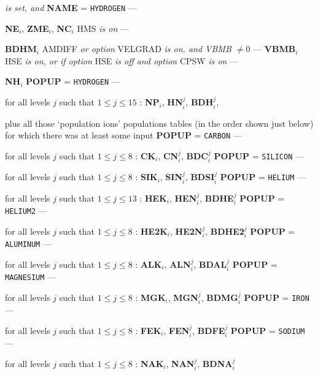 {\it is set, and } {\bf NAME} = {\tt HYDROGEN} --- \par \noindent
{\bf NE}$_i$, {\bf ZME}$_i$, {\bf NC}$_i$
\spice
{} HMS {\it is on} --- \par \noindent
{\bf BDHM}$_i$
\spice
{} AMDIFF {\it or option } VELGRAD
{\it is on, and {\rm VBMB} $\neq 0$} --- \np
{\bf VBMB}$_i$
\spice
{} HSE {\it is on, or if option }
HSE {\it is off and option } CPSW {\it is on} --- \par \noindent
{\bf NH}$_i$
\spice
{} {\bf POPUP} = {\tt HYDROGEN} --- \par \noindent
for all levels $j$ such that $1 \leq j \leq 15$ :
{\bf NP}$_i$, {\bf HN}$^j_i$, {\bf BDH}$^j_i$, \par \noindent
plus all those `population ions' populations tables (in the order shown
just below) for which there was at least some input
\spice
{} {\bf POPUP} = {\tt CARBON} --- \par \noindent
for all levels $j$ such that $1 \leq j \leq 8$ :
{\bf CK}$_i$, {\bf CN}$^j_i$, {\bf BDC}$^j_i$
\spice
{} {\bf POPUP} = {\tt SILICON} --- \par \noindent
for all levels $j$ such that $1 \leq j \leq 8$ :
{\bf SIK}$_i$, {\bf SIN}$^j_i$, {\bf BDSI}$^j_i$
\spice
{} {\bf POPUP} = {\tt HELIUM} --- \par \noindent
for all levels $j$ such that $1 \leq j \leq 13$ :
{\bf HEK}$_i$, {\bf HEN}$^j_i$, {\bf BDHE}$^j_i$
\spice
{} {\bf POPUP} = {\tt HELIUM2} --- \par \noindent
for all levels $j$ such that $1 \leq j \leq 8$ :
{\bf HE2K}$_i$, {\bf HE2N}$^j_i$, {\bf BDHE2}$^j_i$
\spice
{} {\bf POPUP} = {\tt ALUMINUM} --- \par \noindent
for all levels $j$ such that $1 \leq j \leq 8$ :
{\bf ALK}$_i$, {\bf ALN}$^j_i$, {\bf BDAL}$^j_i$
\spice
{} {\bf POPUP} = {\tt MAGNESIUM} --- \par \noindent
for all levels $j$ such that $1 \leq j \leq 8$ :
{\bf MGK}$_i$, {\bf MGN}$^j_i$, {\bf BDMG}$^j_i$
\spice
{} {\bf POPUP} = {\tt IRON} --- \par \noindent
for all levels $j$ such that $1 \leq j \leq 8$ :
{\bf FEK}$_i$, {\bf FEN}$^j_i$, {\bf BDFE}$^j_i$
\ej
{} {\bf POPUP} = {\tt SODIUM} --- \par \noindent
for all levels $j$ such that $1 \leq j \leq 8$ :
{\bf NAK}$_i$, {\bf NAN}$^j_i$, {\bf BDNA}$^j_i$
